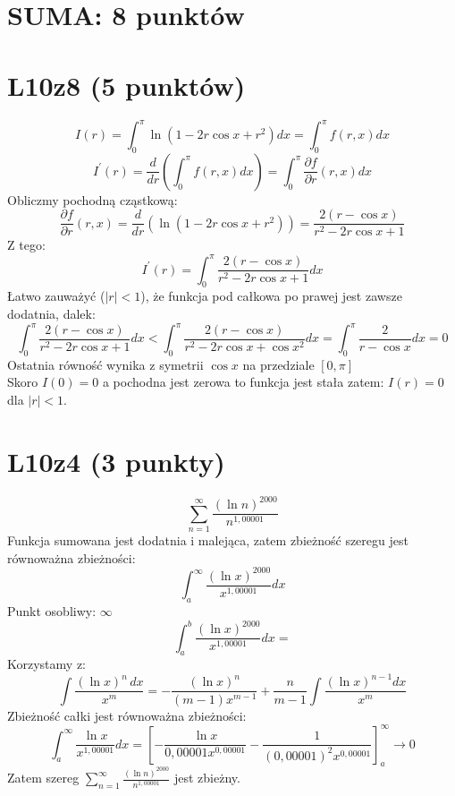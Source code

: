 \documentclass{article}
\title{}
\date{04.05.2020}
\author{Maurycy Borkowski}
\begin{document}
\maketitle

\section{SUMA: 8 punktów}
\section{L10z8 (5 punktów)}

$$
I(r) = \int_0^\pi \ln{(1 - 2r \cos x + r^2)}dx = \int_0^\pi f(r,x)dx
$$
$$
I^\prime(r) = \frac{d}{dr} \left( \int_0^\pi f(r,x)dx \right) = \int_0^\pi \frac{\partial f}{\partial r} (r,x) dx
$$
Obliczmy pochodną cząstkową:
$$
\frac{\partial f}{\partial r} (r,x) = \frac{d}{dr} (\ln{(1 - 2r \cos x + r^2)}) = \frac{2(r-\cos x)}{r^2 -2r \cos x + 1}
$$
Z tego:
$$
I^\prime(r) = \int_0^\pi \frac{2(r-\cos x)}{r^2 -2r \cos x + 1} dx
$$
Łatwo zauważyć ($|r| < 1$), że funkcja pod całkowa po prawej jest zawsze dodatnia, dalek:
$$
\int_0^\pi \frac{2(r-\cos x)}{r^2 -2r \cos x + 1} dx < \int_0^\pi \frac{2(r-\cos x)}{r^2 -2r \cos x + {\cos x}^2} dx = \int_0^\pi \frac{2}{r-\cos x} dx = 0
$$
Ostatnia równość wynika z symetrii $\cos x$ na przedziale $[0,\pi]$\\
Skoro $I(0) = 0$ a pochodna jest zerowa to funkcja jest stała zatem:
$I(r) = 0$ dla $|r| < 1$.
\section{L10z4 (3 punkty)}
$$
\sum_{n=1}^{\infty} \frac{(\ln n)^{2000}}{n^{1,00001}}
$$
Funkcja sumowana jest dodatnia i malejąca, zatem zbieżność szeregu jest równoważna zbieżności:
$$
\int_a^\infty \frac{(\ln x)^{2000}}{x^{1,00001}} dx
$$
Punkt osobliwy: $\infty$
$$
\int_a^b \frac{(\ln x)^{2000}}{x^{1,00001}} dx = 
$$
Korzystamy z:
$$
\int \frac{(\ln x)^n\,dx}{x^m} = -\frac{(\ln x)^n}{(m-1)x^{m-1}} + \frac{n}{m-1}\int\frac{(\ln x)^{n-1} dx}{x^m}
$$
Zbieżność całki jest równoważna zbieżności:
$$
\int_a^\infty \frac{\ln x}{x^{1,00001}} dx = \left [-\frac{\ln x}{0,00001x^{0,00001}}-\frac{1}{(0,00001)^2 x^{0,00001}} \right]_a^\infty \rightarrow 0
$$
Zatem szereg $
\sum_{n=1}^{\infty} \frac{(\ln n)^{2000}}{n^{1,00001}}
$ jest zbieżny.
\end{document}
